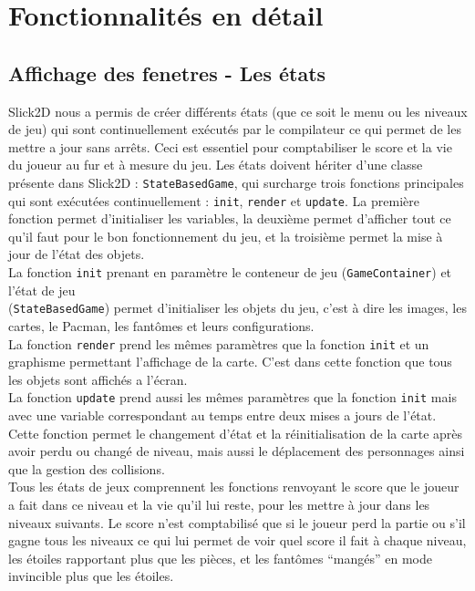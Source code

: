   \chapter*{Fonctionnalités en détail}
   \setcounter{chapter}{3}
    
    \section{Affichage des fenetres - Les états}
    Slick2D nous a permis de créer différents états (que ce soit le menu ou les niveaux de jeu) qui sont continuellement exécutés par le compilateur ce qui permet de les mettre a jour sans arrêts.
    Ceci est essentiel pour comptabiliser le score et la vie du joueur au fur et à mesure du jeu. Les états doivent hériter d'une classe présente dans Slick2D : \texttt{StateBasedGame}, qui 
    surcharge trois fonctions principales qui sont exécutées continuellement : \texttt{init}, \texttt{render} et \texttt{update}. La première fonction permet d'initialiser les variables, la 
    deuxième permet d'afficher tout ce qu'il faut pour le bon fonctionnement du jeu, et la troisième permet la mise à jour de l'état des objets.\\
    La fonction \texttt{init} prenant en paramètre le conteneur de jeu (\texttt{GameContainer}) et l'état de jeu \\(\texttt{StateBasedGame}) permet d'initialiser les objets du jeu, c'est à dire 
    les images, les cartes, le Pacman, les fantômes et leurs configurations.\\
    La fonction \texttt{render} prend les mêmes paramètres que la fonction \texttt{init} et un graphisme permettant l'affichage de la carte. C'est dans cette fonction que tous les objets sont 
    affichés a l'écran.\\
    La fonction \texttt{update} prend aussi les mêmes paramètres que la fonction \texttt{init} mais avec une variable correspondant au temps entre deux mises a jours de l'état. 
    Cette fonction permet le changement d'état et la réinitialisation de la carte après avoir perdu ou changé de niveau, mais aussi le déplacement des personnages ainsi que la gestion des 
    collisions.\\
    Tous les états de jeux comprennent les fonctions renvoyant le score que le joueur a fait dans ce niveau et la vie qu'il lui reste, pour les mettre à jour dans les niveaux suivants. 
    Le score n'est comptabilisé que si le joueur perd la partie ou s'il gagne tous les niveaux ce qui lui permet de voir quel score il fait à chaque niveau, les étoiles rapportant plus que les 
    pièces, et les fantômes ``mangés'' en mode invincible plus que les étoiles.\\

